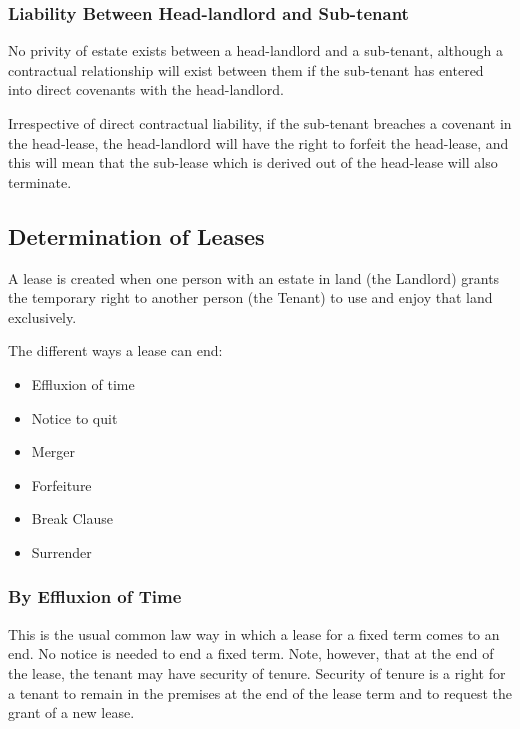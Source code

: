 \documentclass[
]{article}
\providecommand{\tightlist}{%
  \setlength{\itemsep}{0pt}\setlength{\parskip}{0pt}}
\begin{document}
\hypertarget{liability-between-head-landlord-and-sub-tenant}{%
\subsubsection{Liability Between Head-landlord and
Sub-tenant}\label{liability-between-head-landlord-and-sub-tenant}}

No privity of estate exists between a head-landlord and a sub-tenant,
although a contractual relationship will exist between them if the
sub-tenant has entered into direct covenants with the head-landlord.

Irrespective of direct contractual liability, if the sub-tenant breaches
a covenant in the head-lease, the head-landlord will have the right to
forfeit the head-lease, and this will mean that the sub-lease which is
derived out of the head-lease will also terminate.

\hypertarget{determination-of-leases}{%
\subsection{Determination of Leases}\label{determination-of-leases}}

A lease is created when one person with an estate in land (the Landlord)
grants the temporary right to another person (the Tenant) to use and
enjoy that land exclusively.

The different ways a lease can end:

\begin{itemize}
\tightlist
\item
  Effluxion of time
\item
  Notice to quit
\item
  Merger
\item
  Forfeiture
\item
  Break Clause
\item
  Surrender
\end{itemize}

\hypertarget{by-effluxion-of-time}{%
\subsubsection{By Effluxion of Time}\label{by-effluxion-of-time}}

This is the usual common law way in which a lease for a fixed term comes
to an end. No notice is needed to end a fixed term. Note, however, that
at the end of the lease, the tenant may have security of tenure.
Security of tenure is a right for a tenant to remain in the premises at
the end of the lease term and to request the grant of a new lease.
\end{document}
